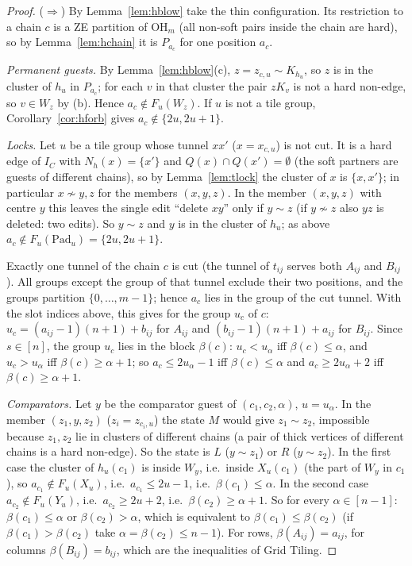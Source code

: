 \begin{proof}
($\Rightarrow$) By Lemma~\ref{lem:hblow} take the thin configuration. Its restriction to a chain $c$ is a ZE partition of $\mathrm{OH}_m$ (all non-soft pairs inside the chain are hard), so by Lemma~\ref{lem:hchain} it is $P_{a_c}$ for one position $a_c$.

\emph{Permanent guests.} By Lemma~\ref{lem:hblow}(c), $z=z_{c,u}\sim K_{h_u}$, so $z$ is in the cluster of $h_u$ in $P_{a_c}$; for each $v$ in that cluster the pair $zK_v$ is not a hard non-edge, so $v\in W_z$ by (b). Hence $a_c\notin F_u(W_z)$. If $u$ is not a tile group, Corollary~\ref{cor:hforb} gives $a_c\notin\{2u,2u+1\}$.

\emph{Locks.} Let $u$ be a tile group whose tunnel $xx'$ ($x=x_{c,u}$) is not cut. It is a hard edge of $I_C$ with $N_h(x)=\{x'\}$ and $Q(x)\cap Q(x')=\emptyset$ (the soft partners are guests of different chains), so by Lemma~\ref{lem:tlock} the cluster of $x$ is $\{x,x'\}$; in particular $x\not\sim y,z$ for the members $(x,y,z)$. In the member $(x,y,z)$ with centre $y$ this leaves the single edit ``delete $xy$'' only if $y\sim z$ (if $y\not\sim z$ also $yz$ is deleted: two edits). So $y\sim z$ and $y$ is in the cluster of $h_u$; as above $a_c\notin F_u(\mathrm{Pad}_u)=\{2u,2u+1\}$.

Exactly one tunnel of the chain $c$ is cut (the tunnel of $t_{ij}$ serves both $A_{ij}$ and $B_{ij}$). All groups except the group of that tunnel exclude their two positions, and the groups partition $\{0,\dots,m-1\}$; hence $a_c$ lies in the group of the cut tunnel. With the slot indices above, this gives for the group $u_c$ of $c$: $u_c=(a_{ij}-1)(n+1)+b_{ij}$ for $A_{ij}$ and $(b_{ij}-1)(n+1)+a_{ij}$ for $B_{ij}$. Since $s\in[n]$, the group $u_c$ lies in the block $\beta(c)$: $u_c<u_\alpha$ iff $\beta(c)\le\alpha$, and $u_c>u_\alpha$ iff $\beta(c)\ge\alpha+1$; so $a_c\le2u_\alpha-1$ iff $\beta(c)\le\alpha$ and $a_c\ge2u_\alpha+2$ iff $\beta(c)\ge\alpha+1$.

\emph{Comparators.} Let $y$ be the comparator guest of $(c_1,c_2,\alpha)$, $u=u_\alpha$. In the member $(z_1,y,z_2)$ ($z_i=z_{c_i,u}$) the state $M$ would give $z_1\sim z_2$, impossible because $z_1,z_2$ lie in clusters of different chains (a pair of thick vertices of different chains is a hard non-edge). So the state is $L$ ($y\sim z_1$) or $R$ ($y\sim z_2$). In the first case the cluster of $h_u(c_1)$ is inside $W_y$, i.e.\ inside $X_u(c_1)$ (the part of $W_y$ in $c_1$), so $a_{c_1}\notin F_u(X_u)$, i.e.\ $a_{c_1}\le2u-1$, i.e.\ $\beta(c_1)\le\alpha$. In the second case $a_{c_2}\notin F_u(Y_u)$, i.e.\ $a_{c_2}\ge2u+2$, i.e.\ $\beta(c_2)\ge\alpha+1$. So for every $\alpha\in[n-1]$: $\beta(c_1)\le\alpha$ or $\beta(c_2)>\alpha$, which is equivalent to $\beta(c_1)\le\beta(c_2)$ (if $\beta(c_1)>\beta(c_2)$ take $\alpha=\beta(c_2)\le n-1$). For rows, $\beta(A_{ij})=a_{ij}$, for columns $\beta(B_{ij})=b_{ij}$, which are the inequalities of Grid Tiling.


\end{proof}

